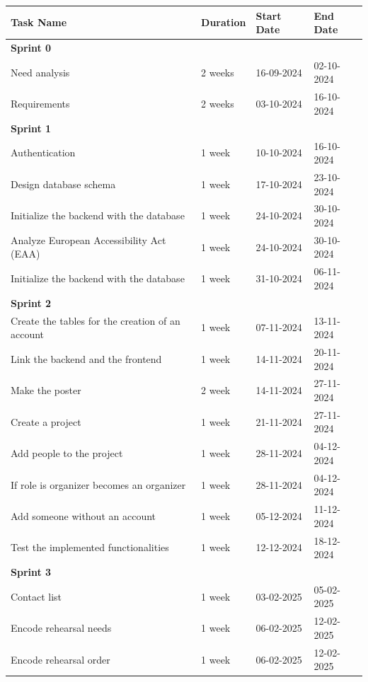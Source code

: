 \documentclass[11pt]{article}
\begin{document}
\begin{table}[htbp]
    \centering
    \begin{tabular}{| p{9cm} | p{2cm} | p{2.1cm} | p{2cm} |}
    \hline
    \textbf{Task Name} & \textbf{Duration} & \textbf{Start Date} & \textbf{End Date} \\
    \hline
    \textbf{Sprint 0} &&&\\
    \quad Need analysis & 2 weeks & 16-09-2024 & 02-10-2024 \\
    \quad Requirements & 2 weeks & 03-10-2024 & 16-10-2024 \\
    \textbf{Sprint 1} &&&\\
    \quad Authentication & 1 week & 10-10-2024 & 16-10-2024 \\
    \quad Design database schema & 1 week & 17-10-2024 & 23-10-2024 \\
    \quad Initialize the backend with the database & 1 week & 24-10-2024 & 30-10-2024 \\
    \quad Analyze European Accessibility Act (EAA) & 1 week & 24-10-2024 & 30-10-2024 \\
    \quad Initialize the backend with the database & 1 week & 31-10-2024 & 06-11-2024\\
    \textbf{Sprint 2} &&&\\
    \quad Create the tables for the creation of an account & 1 week & 07-11-2024 & 13-11-2024 \\
    \quad Link the backend and the frontend & 1 week & 14-11-2024 & 20-11-2024 \\
    \quad Make the poster & 2 week & 14-11-2024 & 27-11-2024 \\
    \quad Create a project & 1 week & 21-11-2024 & 27-11-2024 \\
    \quad Add people to the project & 1 week & 28-11-2024 & 04-12-2024 \\
    \quad If role is organizer becomes an organizer & 1 week & 28-11-2024 & 04-12-2024 \\
    \quad Add someone without an account & 1 week & 05-12-2024 & 11-12-2024 \\
    \quad Test the implemented functionalities & 1 week & 12-12-2024 & 18-12-2024 \\
    \textbf{Sprint 3} &&&\\
    \quad Contact list & 1 week & 03-02-2025 & 05-02-2025 \\
    \quad Encode rehearsal needs & 1 week & 06-02-2025 & 12-02-2025\\
    \quad Encode rehearsal order & 1 week & 06-02-2025 & 12-02-2025\\

\end{tabular}
\end{table}
\end{document}
